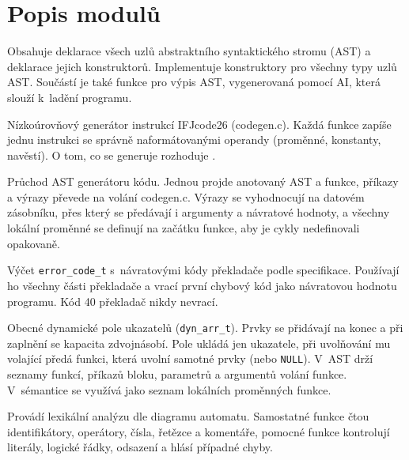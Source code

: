 \section{Popis modulů}\label{sec:moduly}

\begin{description}[style=nextline]
  \item[\texttt{ast.c/.h}]
    Obsahuje deklarace všech uzlů abstraktního syntaktického stromu (AST)
    a deklarace jejich konstruktorů. Implementuje konstruktory pro všechny
    typy uzlů AST. Součástí je také funkce pro výpis AST, vygenerovaná
    pomocí AI, která slouží k~ladění programu.
  \item[\texttt{codegen.c/.h}]
    Nízkoúrovňový generátor instrukcí IFJcode26 (codegen.c). Každá funkce
    zapíše jednu instrukci se správně naformátovanými operandy (proměnné, konstanty, navěstí).
    O tom, co se generuje rozhoduje .
  \item[\texttt{codegen\_ast.c/.h}]
    Průchod AST generátoru kódu. Jednou projde anotovaný AST a funkce,
    příkazy a výrazy převede na volání codegen.c. Výrazy se vyhodnocují
    na datovém zásobníku, přes který se předávají i argumenty a návratové hodnoty,
    a všechny lokální proměnné se definují na začátku funkce, aby je cykly nedefinovali opakovaně.
  \item[\texttt{comp\_error.h}]
    Výčet \texttt{error\_code\_t} s~návratovými kódy překladače podle specifikace.
    Používají ho všechny části překladače a  vrací první chybový kód
    jako návratovou hodnotu programu. Kód 40 překladač nikdy nevrací.
  \item[\texttt{dynamic\_array.c/.h}]
    Obecné dynamické pole ukazatelů (\texttt{dyn\_arr\_t}). Prvky se přidávají na konec a při zaplnění se kapacita zdvojnásobí.
    Pole ukládá jen ukazatele, při uvolňování mu volající předá funkci, která uvolní samotné prvky (nebo \texttt{NULL}).
    V~AST drží seznamy funkcí, příkazů bloku, parametrů a argumentů volání funkce. V~sémantice se využívá jako seznam lokálních
    proměnných funkce.
  \item[\texttt{lexer.c/.h}]
    Provádí lexikální analýzu dle diagramu automatu. Samostatné funkce čtou
    identifikátory, operátory, čísla, řetězce a komentáře, pomocné funkce
    kontrolují literály, logické řádky, odsazení a hlásí případné chyby.

\end{description}
